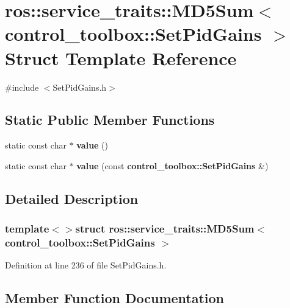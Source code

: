 \section{ros\-:\-:service\-\_\-traits\-:\-:\-M\-D5\-Sum$<$ control\-\_\-toolbox\-:\-:\-Set\-Pid\-Gains $>$ \-Struct \-Template \-Reference}
\label{structros_1_1service__traits_1_1MD5Sum_3_01control__toolbox_1_1SetPidGains_01_4}


{\ttfamily \#include $<$\-Set\-Pid\-Gains.\-h$>$}

\subsection*{\-Static \-Public \-Member \-Functions}
\begin{DoxyCompactItemize}
\item 
static const char $\ast$ {\bf value} ()
\item 
static const char $\ast$ {\bf value} (const {\bf control\-\_\-toolbox\-::\-Set\-Pid\-Gains} \&)
\end{DoxyCompactItemize}


\subsection{\-Detailed \-Description}
\subsubsection*{template$<$$>$struct ros\-::service\-\_\-traits\-::\-M\-D5\-Sum$<$ control\-\_\-toolbox\-::\-Set\-Pid\-Gains $>$}



\-Definition at line 236 of file \-Set\-Pid\-Gains.\-h.



\subsection{\-Member \-Function \-Documentation}
